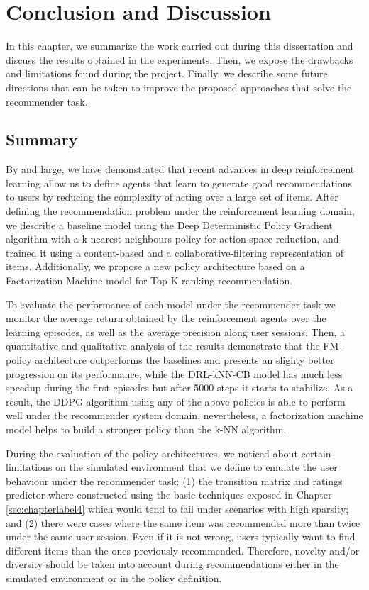 \chapter{Conclusion and Discussion}
\label{chapterlabel4}

In this chapter, we summarize the work carried out during this dissertation and discuss the results obtained in the experiments. Then, we expose the drawbacks and limitations found during the project. Finally, we describe some future directions that can be taken to improve the proposed approaches that solve the recommender task.

\section{Summary}

By and large, we have demonstrated that recent advances in deep reinforcement learning allow us to define agents that learn to generate good recommendations to users by reducing the complexity of acting over a large set of items. After defining the recommendation problem under the reinforcement learning domain, we describe a baseline model using the Deep Deterministic Policy Gradient algorithm with a k-nearest neighbours policy for action space reduction, and trained it using a content-based and a collaborative-filtering representation of items. Additionally, we propose a new policy architecture based on a Factorization Machine model for Top-K ranking recommendation.

To evaluate the performance of each model under the recommender task we monitor the average return obtained by the reinforcement agents over the learning episodes, as well as the average precision along user sessions. Then, a quantitative and qualitative analysis of the results demonstrate that the FM-policy architecture outperforms the baselines and presents an slighty better progression on its performance, while the DRL-kNN-CB model has much less speedup during the first episodes but after 5000 steps it starts to stabilize. As a result, the DDPG algorithm using any of the above policies is able to perform well under the recommender system domain, nevertheless, a factorization machine model helps to build a stronger policy than the k-NN algorithm.

During the evaluation of the policy architectures, we noticed about certain limitations on the simulated environment that we define to emulate the user behaviour under the recommender task: (1) the transition matrix and ratings predictor where constructed using the basic techniques exposed in Chapter \ref{sec:chapterlabel4} which would tend to fail under scenarios with high sparsity; and (2) there were cases where the same item was recommended more than twice under the same user session. Even if it is not wrong, users typically want to find different items than the ones previously recommended. Therefore, novelty and/or diversity should be taken into account during recommendations either in the simulated environment or in the policy definition.

